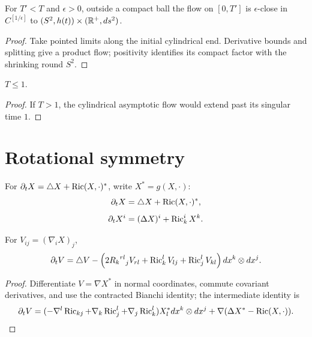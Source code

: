 \begin{proposition}
\label{prop:standard-flow-asymptotic-cylinder}
\label{item5}

For $T'<T$ and $\epsilon>0$, outside a compact ball the flow on
$[0,T']$ is $\epsilon$-close in $C^{[1/\epsilon]}$ to
$(S^2,h(t))\times(\mathbb{R}^+,ds^2)$.
\end{proposition}
\begin{proof}
\sketch Take pointed limits along the initial cylindrical end. Derivative
bounds and splitting give a product flow; positivity identifies its compact
factor with the shrinking round $S^2$.
\end{proof}

\begin{corollary}
\label{cor:standard-flow-time-bound-one}
\label{1}

$T\le1$.
\end{corollary}
\begin{proof}
\sketch If $T>1$, the cylindrical asymptotic flow would extend past its
singular time $1$.
\end{proof}

\section{Rotational symmetry}

For $\partial_tX=\triangle X+\operatorname{Ric}(X,\cdot)^*$, write $X^*=g(X,\cdot)$:
\begin{equation}\label{eq1}\partial_tX=\triangle X+\operatorname{Ric}(X,\cdot)^*,\end{equation}
\begin{equation}\label{eq.3}\partial_tX^i=(\Delta X)^i+\operatorname{Ric}^i_kX^k.\end{equation}

\begin{lemma}[Evolution of $V=\nabla X^*$]
\label{lem:v-tensor-evolution}
\label{12.9}

For $V_{ij}=(\nabla_iX)_j$,
\begin{equation}\label{eq.4}
 \partial_tV=\triangle V-\left(2{{R_k}^{rl}}_jV_{rl}+\operatorname{Ric}_k^lV_{lj}
 +\operatorname{Ric}_j^lV_{kl}\right)dx^k\otimes dx^j.
\end{equation}
\end{lemma}
\begin{proof}
\sketch Differentiate $V=\nabla X^*$ in normal coordinates, commute
covariant derivatives, and use the contracted Bianchi identity; the
intermediate identity is
\begin{equation}\label{eqn1}
 \partial_tV=(-\nabla^l\operatorname{Ric}_{kj}+\nabla_k\operatorname{Ric}_j^l+\nabla_j\operatorname{Ric}_k^l)X_l^*dx^k\otimes dx^j
 +\nabla(\Delta X^*-\operatorname{Ric}(X,\cdot)).
\end{equation}
\end{proof}

